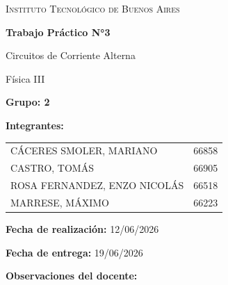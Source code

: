 \begin{titlepage}
    \centering

    \vspace{3cm}

    {\scshape\LARGE Instituto Tecnológico de Buenos Aires \par}
    \vspace{2cm}

    {\Huge\bfseries Trabajo Práctico N°3 \par}
    \vspace{0.5cm}
    {\Large Circuitos de Corriente Alterna \par}
    \vspace{0.5cm}
    {\large Física III \par}

    \vspace{4cm}

    \begin{flushleft}
    {\Large\textbf{Grupo: 2}\par}
    \vspace{0.5cm}

    {\Large\textbf{Integrantes:}\par}
    \vspace{0.3cm}
    \begin{tabular}{l r}
        CÁCERES SMOLER, MARIANO      & 66858 \\
        CASTRO, TOMÁS                & 66905 \\
        ROSA FERNANDEZ, ENZO NICOLÁS & 66518 \\
        MARRESE, MÁXIMO              & 66223 \\
    \end{tabular}
    \end{flushleft}

    \vfill

    \begin{flushleft}
    {\large \textbf{Fecha de realización:} 12/06/2026\par}
    {\large \textbf{Fecha de entrega:} 19/06/2026\par}
    \end{flushleft}

    \vspace{0.6cm}

    \begin{flushleft}
    {\large\textbf{Observaciones del docente:}}\par
    \vspace{0.2cm}
    \framebox[\linewidth]{\rule{0pt}{3cm}}


\end{flushleft}
\end{titlepage}
